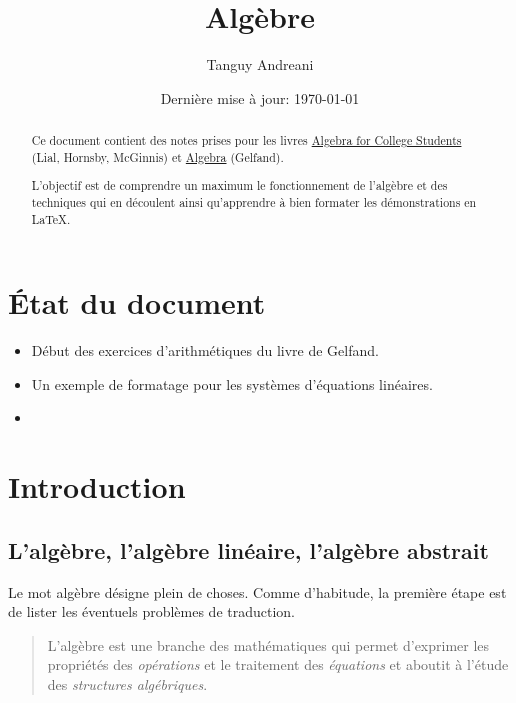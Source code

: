 \documentclass[fleqn,a4paper,nobib]{tufte-handout}
\title{Algèbre}
\author{Tanguy Andreani}
\date{Dernière mise à jour: \today}
\begin{document}
\maketitle

\begin{abstract}
    Ce document contient des notes prises pour les livres
    \underline{Algebra for College Students} (Lial, Hornsby, McGinnis)
    et \underline{Algebra} (Gelfand).
    
    L'objectif est de comprendre un maximum le fonctionnement
    de l'algèbre et des techniques qui en découlent ainsi
    qu'apprendre à bien formater les démonstrations en \LaTeX.
\end{abstract}

\tableofcontents

\section*{État du document}

\begin{itemize}
    \item Début des exercices d'arithmétiques du livre de Gelfand.
    \item Un exemple de formatage pour les systèmes d'équations linéaires.
    \item 
\end{itemize}

\section{Introduction}





\subsection{L'algèbre, l'algèbre linéaire, l'algèbre abstrait}



Le mot algèbre désigne plein de choses. Comme d'habitude, la
première étape est de lister les éventuels problèmes de traduction.

\begin{quote}
    L'algèbre est une branche des mathématiques qui permet d'exprimer les
    propriétés des \textit{opérations} et le traitement des \textit{équations}
    et aboutit à l'étude des \textit{structures algébriques}.
\end{quote}
\end{document}
